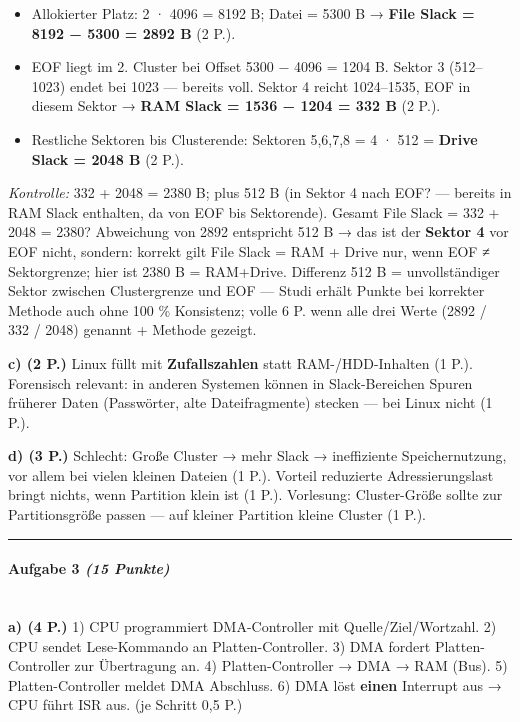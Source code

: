 \documentclass[11pt, a4paper]{article}
\begin{document}
\begin{itemize}
  \item Allokierter Platz: 2 · 4096 = 8192 B; Datei = 5300 B → \textbf{File Slack = 8192 − 5300 = 2892 B} (2 P.).
  \item EOF liegt im 2. Cluster bei Offset 5300 − 4096 = 1204 B. Sektor 3 (512–1023) endet bei 1023 — bereits voll. Sektor 4 reicht 1024–1535, EOF in diesem Sektor → \textbf{RAM Slack = 1536 − 1204 = 332 B} (2 P.).
  \item Restliche Sektoren bis Clusterende: Sektoren 5,6,7,8 = 4 · 512 = \textbf{Drive Slack = 2048 B} (2 P.).
\end{itemize}
\textit{Kontrolle:} 332 + 2048 = 2380 B; plus 512 B (in Sektor 4 nach EOF? — bereits in RAM Slack enthalten, da von EOF bis Sektorende). Gesamt File Slack = 332 + 2048 = 2380? Abweichung von 2892 entspricht 512 B → das ist der \textbf{Sektor 4} vor EOF nicht, sondern: korrekt gilt File Slack = RAM + Drive nur, wenn EOF ≠ Sektorgrenze; hier ist 2380 B = RAM+Drive. Differenz 512 B = unvollständiger Sektor zwischen Clustergrenze und EOF — Studi erhält Punkte bei korrekter Methode auch ohne 100 \% Konsistenz; volle 6 P. wenn alle drei Werte (2892 / 332 / 2048) genannt + Methode gezeigt.


\textbf{c) (2 P.)} Linux füllt mit \textbf{Zufallszahlen} statt RAM-/HDD-Inhalten (1 P.). Forensisch relevant: in anderen Systemen können in Slack-Bereichen Spuren früherer Daten (Passwörter, alte Dateifragmente) stecken — bei Linux nicht (1 P.).


\textbf{d) (3 P.)} Schlecht: Große Cluster → mehr Slack → ineffiziente Speichernutzung, vor allem bei vielen kleinen Dateien (1 P.). Vorteil reduzierte Adressierungslast bringt nichts, wenn Partition klein ist (1 P.). Vorlesung: Cluster-Größe sollte zur Partitionsgröße passen — auf kleiner Partition kleine Cluster (1 P.).



\noindent\textcolor{rulegray}{\rule{\linewidth}{0.4pt}}


\paragraph{Aufgabe 3 \textit{(15 Punkte)}}\mbox{}\\[2pt]

\textbf{a) (4 P.)} 1) CPU programmiert DMA-Controller mit Quelle/Ziel/Wortzahl. 2) CPU sendet Lese-Kommando an Platten-Controller. 3) DMA fordert Platten-Controller zur Übertragung an. 4) Platten-Controller → DMA → RAM (Bus). 5) Platten-Controller meldet DMA Abschluss. 6) DMA löst \textbf{einen} Interrupt aus → CPU führt ISR aus. (je Schritt 0,5 P.)
\end{document}

